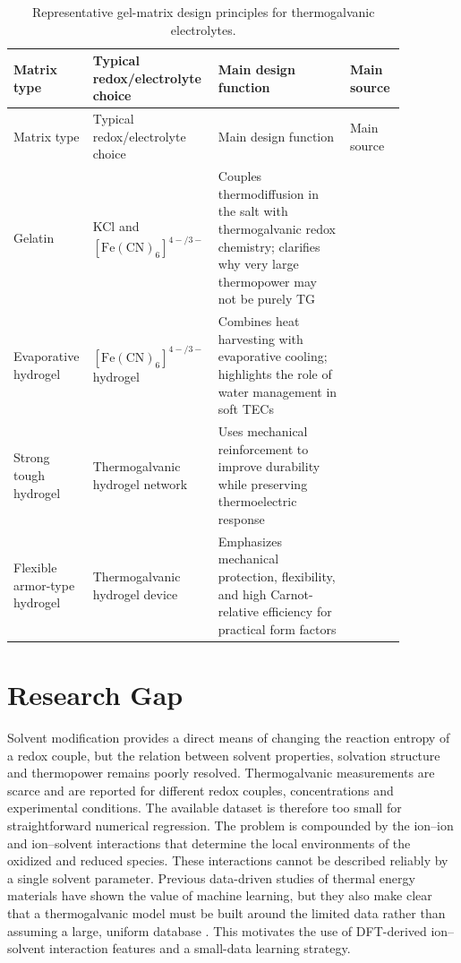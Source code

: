 \begin{longtable}{>{\raggedright\arraybackslash}p{0.18\linewidth}
>{\raggedright\arraybackslash}p{0.22\linewidth}
>{\raggedright\arraybackslash}p{0.33\linewidth}
>{\raggedright\arraybackslash}p{0.14\linewidth}}
\caption{Representative gel-matrix design principles for thermogalvanic
electrolytes.}\\
\toprule
Matrix type & Typical redox/electrolyte choice & Main design function & Main
source \\
\midrule
\endfirsthead
\toprule
Matrix type & Typical redox/electrolyte choice & Main design function & Main
source \\
\midrule
\endhead
Gelatin & KCl and $[\mathrm{Fe(CN)}_6]^{4-/3-}$ & Couples thermodiffusion in
the salt with thermogalvanic redox chemistry; clarifies why very
large thermopower may not be purely TG & \citep{han2020gelatin} \\
Evaporative hydrogel & $[\mathrm{Fe(CN)}_6]^{4-/3-}$ hydrogel & Combines heat
harvesting with evaporative cooling; highlights the role of water management
in soft TECs & \citep{zhou2020hydrogel} \\
Strong tough hydrogel & Thermogalvanic hydrogel network & Uses mechanical
reinforcement to improve durability while preserving thermoelectric response &
\citep{yang2023strong} \\
Flexible armor-type hydrogel & Thermogalvanic hydrogel device & Emphasizes
mechanical protection, flexibility, and high Carnot-relative efficiency for
practical form factors & \citep{liu2024armor} \\
\bottomrule
\end{longtable}

\section{Research Gap}

Solvent modification provides a direct means of changing the reaction entropy
of a redox couple, but the relation between solvent properties, solvation
structure and thermopower remains poorly resolved. Thermogalvanic measurements
are scarce and are reported for different redox couples, concentrations and
experimental conditions. The available dataset is therefore too small for
straightforward numerical regression. The problem is compounded by the
ion--ion and ion--solvent interactions that determine the local environments
of the oxidized and reduced species. These interactions cannot be described
reliably by a single solvent parameter. Previous data-driven studies of thermal
energy materials have shown the value of machine learning, but they also make
clear that a thermogalvanic model must be built around the limited data rather
than assuming a large, uniform database \citep{wu2024unlocking,li2022mlthermal}.
This motivates the use of DFT-derived ion--solvent interaction features and a
small-data learning strategy.

